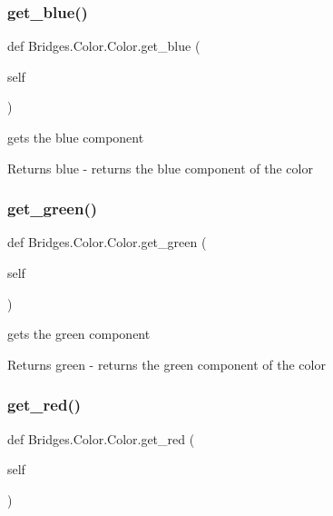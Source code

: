 \subsubsection{\texorpdfstring{get\+\_\+blue()}{get\_blue()}}
{\footnotesize\ttfamily def Bridges.\+Color.\+Color.\+get\+\_\+blue (\begin{DoxyParamCaption}\item[{}]{self }\end{DoxyParamCaption})}



gets the blue component 

\begin{DoxyReturn}{Returns}
blue -\/ returns the blue component of the color 
\end{DoxyReturn}
\mbox{\label{class_bridges_1_1_color_1_1_color_adf7fc94b1b5887936da71b361ead3e51}} 
\subsubsection{\texorpdfstring{get\+\_\+green()}{get\_green()}}
{\footnotesize\ttfamily def Bridges.\+Color.\+Color.\+get\+\_\+green (\begin{DoxyParamCaption}\item[{}]{self }\end{DoxyParamCaption})}



gets the green component 

\begin{DoxyReturn}{Returns}
green -\/ returns the green component of the color 
\end{DoxyReturn}
\mbox{\label{class_bridges_1_1_color_1_1_color_a5bb6cb1066b378968cdb7e61acc3e350}} 
\subsubsection{\texorpdfstring{get\+\_\+red()}{get\_red()}}
{\footnotesize\ttfamily def Bridges.\+Color.\+Color.\+get\+\_\+red (\begin{DoxyParamCaption}\item[{}]{self }\end{DoxyParamCaption})}



